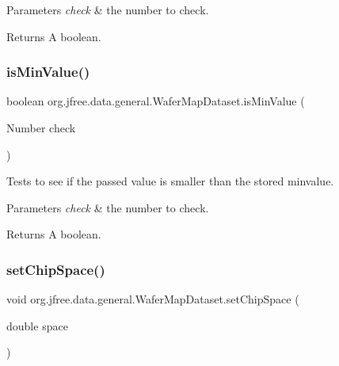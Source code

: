 \begin{DoxyParams}{Parameters}
{\em check} & the number to check.\\
\hline
\end{DoxyParams}
\begin{DoxyReturn}{Returns}
A boolean. 
\end{DoxyReturn}
\mbox{\label{classorg_1_1jfree_1_1data_1_1general_1_1_wafer_map_dataset_ab0a7bac9f4c588cdf88254a973d92fd4}} 
\subsubsection{\texorpdfstring{is\+Min\+Value()}{isMinValue()}}
{\footnotesize\ttfamily boolean org.\+jfree.\+data.\+general.\+Wafer\+Map\+Dataset.\+is\+Min\+Value (\begin{DoxyParamCaption}\item[{Number}]{check }\end{DoxyParamCaption})}

Tests to see if the passed value is smaller than the stored minvalue.


\begin{DoxyParams}{Parameters}
{\em check} & the number to check.\\
\hline
\end{DoxyParams}
\begin{DoxyReturn}{Returns}
A boolean. 
\end{DoxyReturn}
\mbox{\label{classorg_1_1jfree_1_1data_1_1general_1_1_wafer_map_dataset_a39b7f83004cb771e1fddc990876356e2}} 
\subsubsection{\texorpdfstring{set\+Chip\+Space()}{setChipSpace()}}
{\footnotesize\ttfamily void org.\+jfree.\+data.\+general.\+Wafer\+Map\+Dataset.\+set\+Chip\+Space (\begin{DoxyParamCaption}\item[{double}]{space }\end{DoxyParamCaption})}

